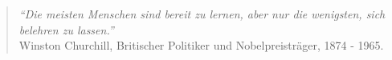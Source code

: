 % 
% 
% 
% 
% 
% 
% 


\newpage
\thispagestyle{empty}
\vspace*{\fill}
\begin{quotation}
\textit{"`Die meisten Menschen sind bereit zu lernen, aber nur die wenigsten, sich belehren zu lassen."'}\\
{\footnotesize Winston Churchill, Britischer Politiker und Nobelpreisträger,
1874 - 1965.}
\end{quotation}
\vfill